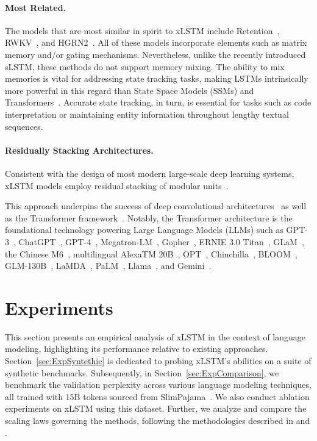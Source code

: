 \paragraph{Most Related.} The models that are most similar in spirit to xLSTM include Retention~\citep{Sun:23arxiv}, RWKV~\citep{Peng:23arxivshort,Peng:24arxivshort}, and HGRN2~\citep{Qin:24arxiv}. All of these models incorporate elements such as matrix memory and/or gating mechanisms. Nevertheless, unlike the recently introduced sLSTM, these methods do not support memory mixing. The ability to mix memories is vital for addressing state tracking tasks, making LSTMs intrinsically more powerful in this regard than State Space Models (SSMs) and Transformers~\citep{Merrill:24,Deletang:23}. Accurate state tracking, in turn, is essential for tasks such as code interpretation or maintaining entity information throughout lengthy textual sequences.

\paragraph{Residually Stacking Architectures.} Consistent with the design of most modern large-scale deep learning systems, xLSTM models employ residual stacking of modular units~\citep{Srivastava:15,He:16}.

This approach underpins the success of deep convolutional architectures~\citep{He:16} as well as the Transformer framework~\citep{Vaswani:17}. Notably, the Transformer architecture is the foundational technology powering Large Language Models (LLMs) such as GPT-3~\citep{Brown:20short}, ChatGPT~\citep{Schulman:22short}, GPT-4~\citep{Achiam:23gpt4short}, Megatron-LM~\citep{Shoeybi:19}, Gopher~\citep{Rae:21short}, ERNIE 3.0 Titan~\citep{Wang:21arxivshort}, GLaM~\citep{Du:21glamshort}, the Chinese M6~\citep{Lin:21}, multilingual AlexaTM 20B~\citep{Soltan:22}, OPT~\citep{Zhang:22opt}, Chinchilla~\citep{Hoffmann:22short}, BLOOM~\citep{Scao:22arxivshort}, GLM-130B~\citep{Zeng:22arxivshort}, LaMDA~\citep{Thoppilan:22short}, PaLM~\citep{Chowdhery:22short}, Llama~\citep{Touvron:23arxiv}, and Gemini~\citep{GeminiTeam:23arxiv,Reid:24arxiv}.

\section{Experiments}
\label{sec:Exp}

This section presents an empirical analysis of xLSTM in the context of language modeling, highlighting its performance relative to existing approaches. Section~\ref{sec:ExpSyntethic} is dedicated to probing xLSTM's abilities on a suite of synthetic benchmarks. Subsequently, in Section~\ref{sec:ExpComparison}, we benchmark the validation perplexity across various language modeling techniques, all trained with 15B tokens sourced from SlimPajama~\citep{Soboleva:23}. We also conduct ablation experiments on xLSTM using this dataset. Further, we analyze and compare the scaling laws governing the methods, following the methodologies described in \citet{Kaplan:20} and \citet{Brown:20short}. 

